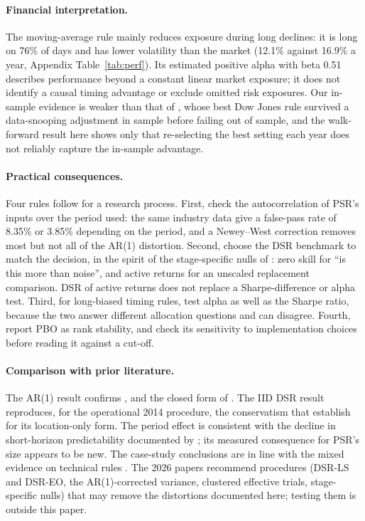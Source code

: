 \documentclass[11pt,a4paper]{article}
\begin{document}
\paragraph{Financial interpretation.} The moving-average rule mainly reduces exposure during long declines: it is long on 76\% of days and has lower volatility than the market (12.1\% against 16.9\% a year, Appendix Table~\ref{tab:perf}). Its estimated positive alpha with beta 0.51 describes performance beyond a constant linear market exposure; it does not identify a causal timing advantage or exclude omitted risk exposures. Our in-sample evidence is weaker than that of \citet{sullivan1999}, whose best Dow Jones rule survived a data-snooping adjustment in sample before failing out of sample, and the walk-forward result here shows only that re-selecting the best setting each year does not reliably capture the in-sample advantage.

\paragraph{Practical consequences.} Four rules follow for a research process. First, check the autocorrelation of PSR's inputs over the period used: the same industry data give a false-pass rate of 8.35\% or 3.85\% depending on the period, and a Newey--West correction removes most but not all of the AR(1) distortion. Second, choose the DSR benchmark to match the decision, in the spirit of the stage-specific nulls of \citet[Exhibit~8]{lopezdeprado2026lipton}: zero skill for ``is this more than noise'', and active returns for an unscaled replacement comparison. DSR of active returns does not replace a Sharpe-difference or alpha test. Third, for long-biased timing rules, test alpha as well as the Sharpe ratio, because the two answer different allocation questions and can disagree. Fourth, report PBO as rank stability, and check its sensitivity to implementation choices before reading it against a cut-off.

\paragraph{Comparison with prior literature.} The AR(1) result confirms \citet{lo2002}, \citet[Remark~3.1]{ledoit2008} and the closed form of \citet[Eq.~2]{lopezdeprado2026lipton}. The IID DSR result reproduces, for the operational 2014 procedure, the conservatism that \citet{lopezdeprado2026porcu} establish for its location-only form. The period effect is consistent with the decline in short-horizon predictability documented by \citet{chordia2008}; its measured consequence for PSR's size appears to be new. The case-study conclusions are in line with the mixed evidence on technical rules \citep{park2007,bajgrowicz2012}. The 2026 papers recommend procedures (DSR-LS and DSR-EO, the AR(1)-corrected variance, clustered effective trials, stage-specific nulls) that may remove the distortions documented here; testing them is outside this paper.
\end{document}
